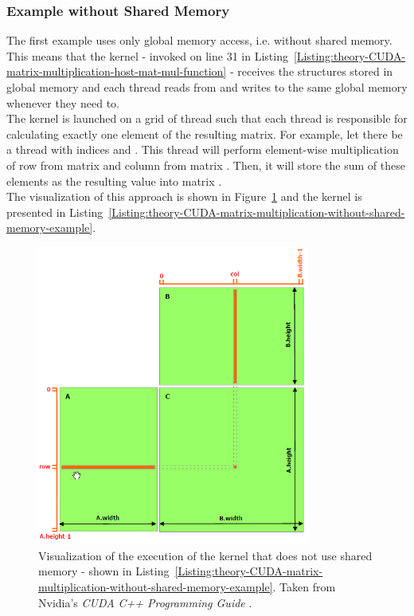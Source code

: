 \subsubsection{Example without Shared Memory}
The first example uses only global memory access, i.e. without shared memory. This means that the kernel - invoked on line 31 in Listing~\ref{Listing:theory-CUDA-matrix-multiplication-host-mat-mul-function} - receives the  structures stored in global memory and each thread reads from and writes to the same global memory whenever they need to. \\
The kernel is launched on a grid of thread such that each thread is responsible for calculating exactly one element of the resulting  matrix. For example, let there be a thread with indices  and . This thread will perform element-wise multiplication of row  from matrix  and column  from matrix . Then, it will store the sum of these elements as the resulting value  into matrix . \\
The visualization of this approach is shown in Figure~\ref{Figure:theory-CUDA-matrix-multiplication-without-shared-memory-example} and the kernel is presented in Listing~\ref{Listing:theory-CUDA-matrix-multiplication-without-shared-memory-example}.

\begin{figure}[ht!]
	\centering
	\includegraphics[width=0.8\textwidth, keepaspectratio]{images/ch1/CUDA-matrix-multiplication-without-shared-memory.png}
	\caption{Visualization of the execution of the kernel that does not use shared memory - shown in Listing~\ref{Listing:theory-CUDA-matrix-multiplication-without-shared-memory-example}. Taken from Nvidia's \emph{CUDA C++ Programming Guide} \cite{NVIDIAMay2022}.}
	\label{Figure:theory-CUDA-matrix-multiplication-without-shared-memory-example}
\end{figure}

